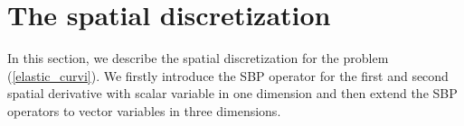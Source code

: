 \section{The spatial discretization}

In this section, we describe the spatial discretization for the problem (\ref{elastic_curvi}). We firstly introduce the SBP operator for the first and second spatial derivative with scalar variable in one dimension and then extend the SBP operators to vector variables in three dimensions.